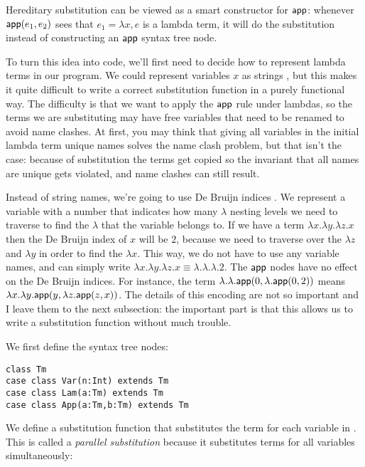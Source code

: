 Hereditary substitution can be viewed as a smart constructor for $\mathsf{app}$: whenever $\mathsf{app}(e_1,e_2)$ sees that $e_1 = \lambda x, e$ is a lambda term, it will do the substitution instead of constructing an $\mathsf{app}$ syntax tree node.

To turn this idea into code, we'll first need to decide how to represent lambda terms in our program.
We could represent variables $x$ as strings , but this makes it quite difficult to write a correct substitution function in a purely functional way.
The difficulty is that we want to apply the $\mathsf{app}$ rule under lambdas, so the terms we are substituting may have free variables that need to be renamed to avoid name clashes.
At first, you may think that giving all variables in the initial lambda term unique names solves the name clash problem, but that isn't the case: because of substitution the terms get copied so the invariant that all names are unique gets violated, and name clashes can still result.

Instead of string names, we're going to use De Bruijn indices \cite{BruijnIndex2021}.
We represent a variable with a number that indicates how many $\lambda$ nesting levels we need to traverse to find the $\lambda$ that the variable belongs to.
If we have a term $\lambda x. \lambda y. \lambda z. x$ then the De Bruijn index of $x$ will be $2$, because we need to traverse over the $\lambda z$ and $\lambda y$ in order to find the $\lambda x$.
This way, we do not have to use any variable names, and can simply write $\lambda x. \lambda y. \lambda z. x \equiv \lambda. \lambda. \lambda. 2$.
The $\mathsf{app}$ nodes have no effect on the De Bruijn indices.
For instance, the term $\lambda. \lambda. \mathsf{app}(0,\lambda. \mathsf{app}(0,2))$ means $\lambda x. \lambda y. \mathsf{app}(y, \lambda z. \mathsf{app}(z,x))$.
The details of this encoding are not so important and I leave them to the next subsection: the important part is that this allows us to write a substitution function without much trouble.

We first define the syntax tree nodes:
\begin{lstlisting}
class Tm
case class Var(n:Int) extends Tm
case class Lam(a:Tm) extends Tm
case class App(a:Tm,b:Tm) extends Tm
\end{lstlisting}

We define a substitution function  that substitutes the term  for each variable  in . This is called a \emph{parallel substitution} because it substitutes terms for all variables simultaneously:

